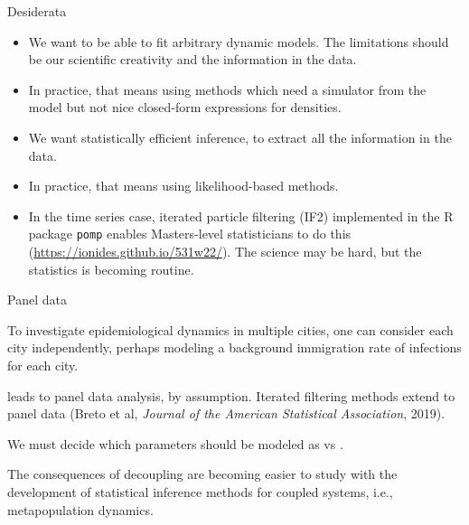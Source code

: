 \documentclass{beamer}
\begin{document}
\begin{frame}{Desiderata}

  \begin{itemize}
    \item We want to be able to fit arbitrary dynamic models. The limitations should be our scientific creativity and the information in the data.

    \item In practice, that means using  methods which need a simulator from the model but not nice closed-form expressions for densities.

    \item We want statistically efficient inference, to extract all the information in the data.

    \item In practice, that means using likelihood-based methods.

      \item  In the time series case, iterated particle filtering (IF2) implemented in the R package \texttt{pomp} enables Masters-level statisticians to do this (\url{https://ionides.github.io/531w22/}). The science may be hard, but the statistics is becoming routine.
      \end{itemize}
  \end{frame}



\begin{frame}{Panel data}

\bi
\item To investigate epidemiological dynamics in multiple cities, one can consider each city independently, perhaps modeling a background immigration rate of infections for each city.

\item {} leads to panel data analysis, by assumption. Iterated filtering methods extend to panel data (Breto et al, {\it Journal of the American Statistical Association}, 2019).

\item We must decide which parameters should be modeled as  vs .

\item The consequences of decoupling are becoming easier to study with the development of statistical inference methods for coupled systems, i.e., metapopulation dynamics.

  \ei

  \end{frame}
\end{document}
